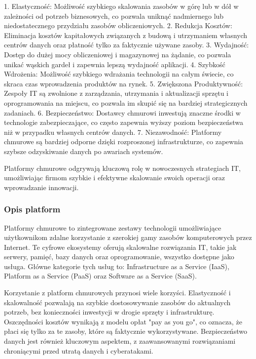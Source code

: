 1. Elastyczność: Możliwość szybkiego skalowania zasobów w górę lub w dół w zależności od potrzeb biznesowych, co pozwala uniknąć nadmiernego lub niedostatecznego przydziału zasobów obliczeniowych.
2. Redukcja Kosztów: Eliminacja kosztów kapitałowych związanych z budową i utrzymaniem własnych centrów danych oraz płatność tylko za faktycznie używane zasoby.
3. Wydajność: Dostęp do dużej mocy obliczeniowej i magazynowej na żądanie, co pozwala unikać wąskich gardeł i zapewnia lepszą wydajność aplikacji.
4. Szybkość Wdrożenia: Możliwość szybkiego wdrażania technologii na całym świecie, co skraca czas wprowadzenia produktów na rynek.
5. Zwiększona Produktywność: Zespoły IT są zwolnione z zarządzania, utrzymania i aktualizacji sprzętu i oprogramowania na miejscu, co pozwala im skupić się na bardziej strategicznych zadaniach.
6. Bezpieczeństwo: Dostawcy chmurowi inwestują znaczne środki w technologie zabezpieczające, co często zapewnia wyższy poziom bezpieczeństwa niż w przypadku własnych centrów danych.
7. Niezawodność: Platformy chmurowe są bardziej odporne dzięki rozproszonej infrastrukturze, co zapewnia szybsze odzyskiwanie danych po awariach systemów.

Platformy chmurowe odgrywają kluczową rolę w nowoczesnych strategiach IT, umożliwiając firmom szybkie i efektywne skalowanie swoich operacji oraz wprowadzanie innowacji.
\subsubsection{Opis platform}
Platformy chmurowe to zintegrowane zestawy technologii umożliwiające użytkownikom zdalne korzystanie z szerokiej gamy zasobów komputerowych przez Internet. Te cyfrowe ekosystemy oferują skalowalne rozwiązania IT, takie jak serwery, pamięć, bazy danych oraz oprogramowanie, wszystko dostępne jako usługa. Główne kategorie tych usług to: Infrastructure as a Service (IaaS), Platform as a Service (PaaS) oraz Software as a Service (SaaS).

Korzystanie z platform chmurowych przynosi wiele korzyści. Elastyczność i skalowalność pozwalają na szybkie dostosowywanie zasobów do aktualnych potrzeb, bez konieczności inwestycji w drogie sprzęty i infrastrukturę. Oszczędności kosztów wynikają z modelu opłat "pay as you go", co oznacza, że płaci się tylko za te zasoby, które są faktycznie wykorzystywane. Bezpieczeństwo danych jest również kluczowym aspektem, z zaawansowanymi rozwiązaniami chroniącymi przed utratą danych i cyberatakami.
